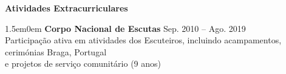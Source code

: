 \noindent\textbf{Atividades Extracurriculares}
\noindent\hrulefill
\vspace{0.25em}
\begin{adjustwidth}{1.5em}{0em}
\textbf{Corpo Nacional de Escutas} \hfill Sep. 2010 -- Ago. 2019 \\
Participação ativa em atividades dos Escuteiros, incluindo acampamentos, cerimónias \hfill Braga, Portugal\\
e projetos de serviço comunitário \hfill (9 anos)\\
\end{adjustwidth}
\vspace{0.25em}